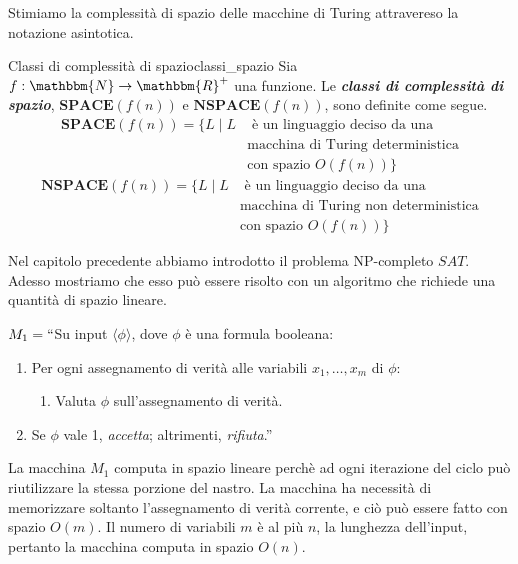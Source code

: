 \documentclass[12pt]{report}
\newcounter{definition}
\newcommand{\nmu}{}
\begin{document}
Stimiamo la complessità di spazio delle macchine di Turing attravereso la notazione asintotica.
\begin{definition}{\nmu Classi di complessità di spazio}{classi_spazio}
	Sia $f: \mathbbm{N} \to \mathbbm{R}^+$ una funzione. Le \textbf{\textit{classi di complessità di spazio}}, $\mathbf{SPACE}(f(n))$ e $\mathbf{NSPACE}(f(n))$, sono definite come segue.
	\begin{align*}
		\mathbf{SPACE}(f(n)) = \{L \mid L & \text{ è un linguaggio deciso da una} \\
		& \text{macchina di Turing deterministica} \\
		& \text{con spazio }O(f(n))\}
	\end{align*}
	\begin{align*}
		\mathbf{NSPACE}(f(n)) = \{L \mid L & \text{ è un linguaggio deciso da una} \\
		& \text{macchina di Turing non deterministica} \\
		& \text{con spazio }O(f(n))\}
	\end{align*}
\end{definition}
\begin{example}{}{}
Nel capitolo precedente abbiamo introdotto il problema NP-completo $SAT$. Adesso mostriamo che esso può essere risolto con un algoritmo che richiede una quantità di spazio lineare.

$M_1 = ``$Su input $\langle \phi \rangle$, dove $\phi$ è una formula booleana:
\begin{enumerate}
	\item Per ogni assegnamento di verità alle variabili $x_1, \dots, x_m$ di $\phi$:
	\begin{enumerate}
		\item Valuta $\phi$ sull'assegnamento di verità.
	\end{enumerate}
	\item Se $\phi$ vale 1, \textit{accetta}; altrimenti, \textit{rifiuta}.''
\end{enumerate}
La macchina $M_1$ computa in spazio lineare perchè ad ogni iterazione del ciclo può riutilizzare la stessa porzione del nastro. La macchina ha necessità di memorizzare soltanto l'assegnamento di verità corrente, e ciò può essere fatto con spazio $O(m)$. Il numero di variabili $m$ è al più $n$, la lunghezza dell'input, pertanto la macchina computa in spazio $O(n)$.
\end{example}
\end{document}
